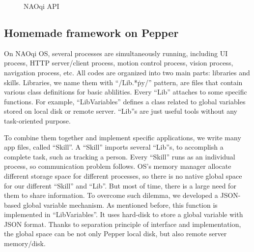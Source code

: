 \begin{figure}[!h]
    \centering
    \hspace{0.2in}
    \caption{NAOqi API}
    \label{fig:naoqi}
\end{figure}

\subsection{Homemade framework on Pepper}
\label{subsec:native}

On NAOqi OS, several processes are simultaneously running, including UI process, HTTP server/client process, motion control process, vision process, navigation process, etc.
All codes are organized into two main parts: libraries and skills. 
Libraries, we name them with “/Lib.*\.py/” pattern, are files that contain various class definitions for basic ablilities. 
Every “Lib” attaches to some specific functions. 
For example, “LibVariables” defines a class related to global variables stored on local disk or remote server. 
“Lib”s are just useful tools without any task-oriented purpose. 

To combine them together and implement specific applications, we write many app files, called “Skill”. 
A “Skill” imports several “Lib”s, to accomplish a complete task, such as tracking a person. 
Every “Skill” runs as an individual process, so communication problem follows. 
OS’s memory manager allocate different storage space for different processes, so there is no native global space for our different “Skill” and “Lib”. 
But most of time, there is a large need for them to share information. 
To overcome such dilemma, we developed a JSON-based global variable mechanism. As mentioned before, this function is implemented in “LibVariables”. 
It uses hard-disk to store a global variable with JSON format. 
Thanks to separation principle of interface and implementation, the global space can be not only Pepper local disk, but also remote server memory/disk. 

